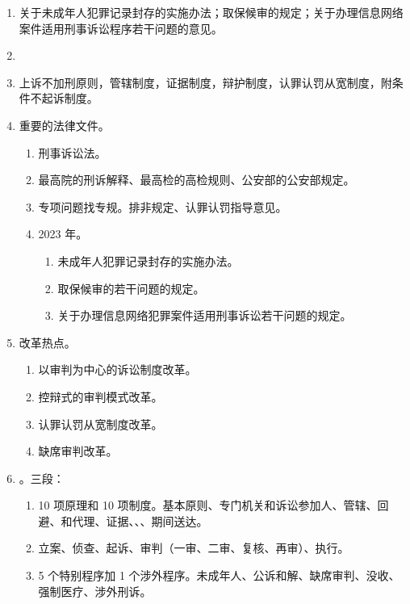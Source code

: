 \begin{enumerate}
  \item 关于未成年人犯罪记录封存的实施办法；取保候审的规定；关于办理信息网络案件适用刑事诉讼程序若干问题的意见。
  \item {}
  \item 上诉不加刑原则，管辖制度，证据制度，辩护制度，认罪认罚从宽制度，附条件不起诉制度。
  \item 重要的法律文件。
        \begin{enumerate}
          \item 刑事诉讼法。
          \item 最高院的刑诉解释、最高检的高检规则、公安部的公安部规定。
          \item 专项问题找专规。排非规定、认罪认罚指导意见。
          \item 2023 年。
                \begin{enumerate}
                  \item 未成年人犯罪记录封存的实施办法。
                  \item 取保候审的若干问题的规定。
                  \item 关于办理信息网络犯罪案件适用刑事诉讼若干问题的规定。
                \end{enumerate}
        \end{enumerate}
  \item 改革热点。
        \begin{enumerate}
          \item 以审判为中心的诉讼制度改革。
          \item 控辩式的审判模式改革。
          \item 认罪认罚从宽制度改革。
          \item 缺席审判改革。
        \end{enumerate}
  \item {}。三段：
        \begin{enumerate}
          \item 10 项原理和 10 项制度。基本原则、专门机关和诉讼参加人、管辖、回避、和代理、证据、、、期间送达。
          \item 立案、侦查、起诉、审判（一审、二审、复核、再审）、执行。
          \item 5 个特别程序加 1 个涉外程序。未成年人、公诉和解、缺席审判、没收、强制医疗、涉外刑诉。
        \end{enumerate}
\end{enumerate}

